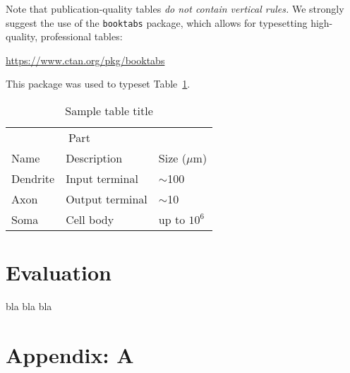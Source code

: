 \documentclass{article}
\begin{document}
Note that publication-quality tables \emph{do not contain vertical
rules.} We strongly suggest the use of the \verb+booktabs+ package,
which allows for typesetting high-quality, professional tables:
\begin{center}
    \url{https://www.ctan.org/pkg/booktabs}
\end{center}
This package was used to typeset Table~\ref{sample-table}.

\begin{table}[t]
    \caption{Sample table title}
    \label{sample-table}
    \centering
    \begin{tabular}{lll}
        \toprule
        \multicolumn{2}{c}{Part}                   \\
        \cmidrule{1-2}
        Name & Description & Size ($\mu$m) \\
        \midrule
        Dendrite & Input terminal & $\sim$100     \\
        Axon & Output terminal & $\sim$10      \\
        Soma & Cell body & up to $10^6$  \\
        \bottomrule
    \end{tabular}
\end{table}

\section{Evaluation}
\label{sec:evaluation}
bla bla bla

\printbibliography

\section*{Appendix: A}
\label{sec:appendix:a}
\end{document}
